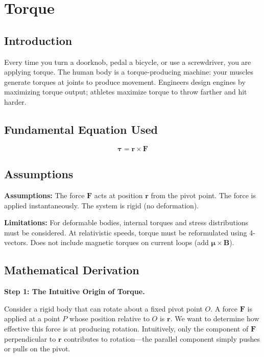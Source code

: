 \chapter{Torque}

\section*{Introduction}

Every time you turn a doorknob, pedal a bicycle, or use a screwdriver, you are applying torque. The human body is a torque-producing machine: your muscles generate torques at joints to produce movement. Engineers design engines by maximizing torque output; athletes maximize torque to throw farther and hit harder.

\section*{Fundamental Equation Used}

\[
\boldsymbol{\tau} = \mathbf{r} \times \mathbf{F}
\]
\section*{Assumptions}

\textbf{Assumptions:} The force $\mathbf{F}$ acts at position $\mathbf{r}$ from the pivot point. The force is applied instantaneously. The system is rigid (no deformation).


\textbf{Limitations:} For deformable bodies, internal torques and stress distributions must be considered. At relativistic speeds, torque must be reformulated using 4-vectors. Does not include magnetic torques on current loops (add $\boldsymbol{\mu} \times \mathbf{B}$).


\section*{Mathematical Derivation}

\textbf{Step 1: The Intuitive Origin of Torque.}

Consider a rigid body that can rotate about a fixed pivot point $O$. A force $\mathbf{F}$ is applied at a point $P$ whose position relative to $O$ is $\mathbf{r}$. We want to determine how effective this force is at producing rotation. Intuitively, only the component of $\mathbf{F}$ perpendicular to $\mathbf{r}$ contributes to rotation---the parallel component simply pushes or pulls on the pivot.

